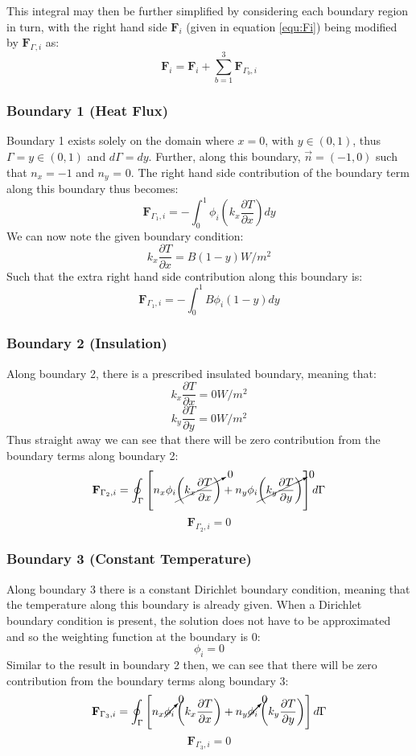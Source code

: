 \documentclass[letterpaper,10pt]{article}
\begin{document}
\noindent This integral may then be further simplified by considering each boundary region in turn, with the right hand side $\mathbf{F}_i$ (given in equation \ref{equ:Fi}) being modified by $\mathbf{F}_{\Gamma,i}$ as:
\[
\boxed{\mathbf{F}_i = \mathbf{F}_i + \displaystyle\sum\limits_{b=1}^3 \mathbf{F}_{\Gamma_b,i}}
\]

\subsubsection{Boundary 1 (Heat Flux)}
Boundary 1 exists solely on the domain where $x=0$, with $y \in (0, 1)$, thus $\Gamma = y \in (0, 1)$ and $d\Gamma = dy$. Further, along this boundary, $\vec{n} = \left(-1,0\right)$ such that $n_x=-1$ and $n_y$ = 0. The right hand side contribution of the boundary term along this boundary thus becomes:
\[\mathbf{F}_{\Gamma_1,i} = -\int_0^1 \phi_i\left(k_x\frac{\partial T}{\partial x}\right)dy\]
We can now note the given boundary condition:
\[k_x\frac{\partial T}{\partial x} = B \left(1-y\right) \unit{}{W/m^2}\]
Such that the extra right hand side contribution along this boundary is:
\begin{equation}
\label{equ:F1i}
\boxed{\mathbf{F}_{\Gamma_1,i} = -\int_0^1 B \phi_i \left(1-y\right)dy}
\end{equation}

\subsubsection{Boundary 2 (Insulation)}
Along boundary 2, there is a prescribed insulated boundary, meaning that:
\[k_x\frac{\partial T}{\partial x} = \unit{0}{W/m^2}\]
\[k_y\frac{\partial T}{\partial y} = \unit{0}{W/m^2}\]
\noindent Thus straight away we can see that there will be zero contribution from the boundary terms along boundary 2:
\[
\mathbf{F}_{\Gamma_2,i} = \oint_\Gamma \left[n_x\phi_i\cancelto{0}{\left(k_x\frac{\partial T}{\partial x}\right)} + n_y\phi_i\cancelto{0}{\left(k_y\frac{\partial T}{\partial y}\right)}\right]d\Gamma
\]
\begin{equation}
\label{equ:F2i}
\boxed{\mathbf{F}_{\Gamma_2,i} = 0}
\end{equation}

\subsubsection{Boundary 3 (Constant Temperature)}
Along boundary 3 there is a constant Dirichlet boundary condition, meaning that the temperature along this boundary is already given. When a Dirichlet boundary condition is present, the solution does not have to be approximated and so the weighting function at the boundary is 0:
\[\phi_i = 0\]
\noindent Similar to the result in boundary 2 then, we can see that there will be zero contribution from the boundary terms along boundary 3:
\[
\mathbf{F}_{\Gamma_3,i} = \oint_\Gamma \left[n_x\cancelto{0}{\phi_i}\left(k_x\frac{\partial T}{\partial x}\right) + n_y\cancelto{0}{\phi_i}\left(k_y\frac{\partial T}{\partial y}\right)\right]d\Gamma
\]
\begin{equation}
\label{equ:F3i}
\boxed{\mathbf{F}_{\Gamma_3,i} = 0}
\end{equation}
\end{document}
